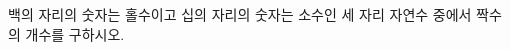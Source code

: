 \hspace*{2mm}\begin{minipage}[t]{\dimexpr\linewidth-2mm\relax}\vspace{0pt}
백의 자리의 숫자는 홀수이고 십의 자리의 숫자는 소수인 세 자리 자연수 중에서 짝수의 개수를 구하시오.\end{minipage}
